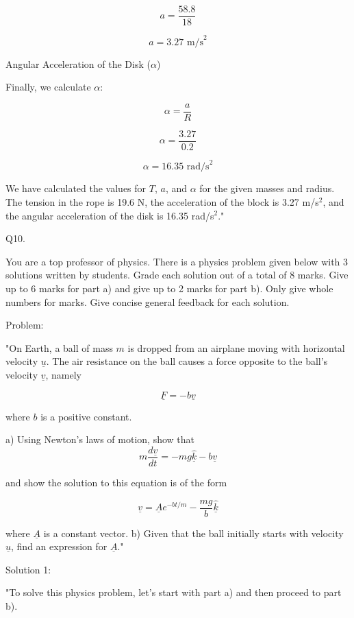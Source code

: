\[
a = \frac{58.8}{18}
\]

\[
a = 3.27 \text{ m/s}^2
\]

Angular Acceleration of the Disk (\( \alpha \))

Finally, we calculate \( \alpha \):

\[
\alpha = \frac{a}{R}
\]

\[
\alpha = \frac{3.27}{0.2}
\]

\[
\alpha = 16.35 \text{ rad/s}^2
\]

We have calculated the values for \( T \), \( a \), and \( \alpha \) for the given masses and radius. The tension in the rope is 19.6 N, the acceleration of the block is 3.27 m/s\(^2\), and the angular acceleration of the disk is 16.35 rad/s\(^2\)."



                           Q10. 

You are a top professor of physics. There is a physics problem given below with 3 solutions written by students. Grade each solution out of a total of 8 marks. Give up to 6 marks for part a) and give up to 2 marks for part b). Only give whole numbers for marks. Give concise general feedback for each solution.

Problem:

"On Earth, a ball of mass \( m \) is dropped from an airplane moving with horizontal velocity \( \underline{u} \). The air resistance on the ball causes a force opposite to the ball's velocity \( \underline{v} \), namely 

\[ \underline{F} = - b \underline{v} \] 
    
where \( b \) is a positive constant. 
    
a) Using Newton's laws of motion, show that 
\[
m\frac{d\underline{v}}{dt} = - mg \hat{\underline{k}} - b\underline{v} 
\]
    
and show the solution to this equation is of the form 
    
\[
\underline{v} = \underline{A} e^{-bt/m} - \frac{mg}{b} \hat{\underline{k}} 
\]
    
where \( \underline{A} \) is a constant vector.
    b) Given that the ball initially starts with velocity \( \underline{u} \), find an expression for \( \underline{A} \)."

Solution 1:

"To solve this physics problem, let's start with part a) and then proceed to part b).

